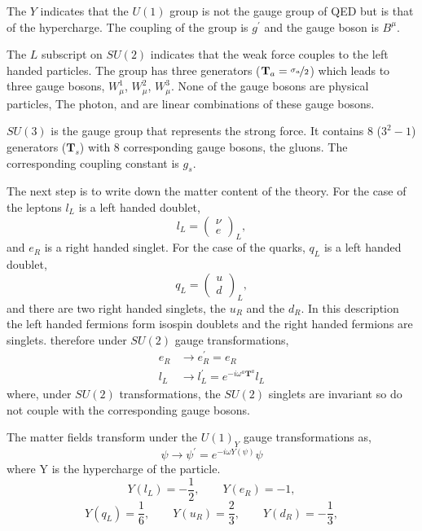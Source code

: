 The $Y$ indicates that the $U(1)$ group is not the gauge
group of QED but is that of the hypercharge. The coupling of the 
group is $g^{\prime}$ and the gauge boson is $B^{\mu}$.

The $L$ subscript on $SU(2)$ indicates that the weak force couples to the left
handed particles. The group has three generators ($\mathbf{T}_{a} =
\nicefrac{\sigma_{a}}{2}$) which leads to three gauge bosons, $W^{1}_{\mu}$,
$W^{2}_{\mu}$, $W^{3}_{\mu}$. None of the gauge bosons are physical particles,
The photon, \PZ and \PWpm are linear combinations of these gauge bosons.

$SU(3)$ is the gauge group that represents the strong force. It contains 8
($3^{2}-1$) generators ($\mathbf{T}_s$) with 8 corresponding gauge
bosons, the gluons. The corresponding coupling constant is $g_s$.

The next step is to write down the matter content of the theory. 
For the case of the leptons $l_{L}$ is a left
handed doublet,
\begin{equation}
l_{L} = \left( \begin{matrix} \nu \\ e \end{matrix} \right)_{L},
\end{equation}
and $e_{R}$ is a right handed singlet.
For the case of the quarks, $q_{L}$ is a left handed doublet,
\begin{equation}
q_{L} = \left( \begin{matrix} u\\ d \end{matrix} \right)_{L},
\end{equation}
and there are two right handed singlets, the $u_{R}$ and the $d_{R}$.
In this
description the left handed fermions form isospin doublets and the right
handed fermions are singlets. 
therefore under $SU(2)$ gauge transformations,
\begin{align}
e_{R} &\to e_{R}^{\prime} = e_{R}\\
l_{L} &\to l_{L}^{\prime} = e^{-i \omega^{a} \mathbf{T}^{a} }l_{L}
\end{align}
where, under $SU(2)$ transformations, the $SU(2)$ singlets are invariant so do
not couple with the corresponding gauge bosons.

The matter fields transform under the $U(1)_Y$ gauge transformations as,
\begin{equation}
\psi \to \psi^{\prime} = e^{-i\omega Y(\psi)}\psi
\end{equation}
where Y is the hypercharge of the particle.
\begin{equation}
Y(l_{L}) = -\frac{1}{2}, \qquad Y(e_{R}) = -1,
\end{equation}
\begin{equation}
Y(q_{L}) =  \frac{1}{6}, \qquad Y(u_{R}) =  \frac{2}{3}, \qquad Y(d_{R}) = -\frac{1}{3},
\end{equation}

